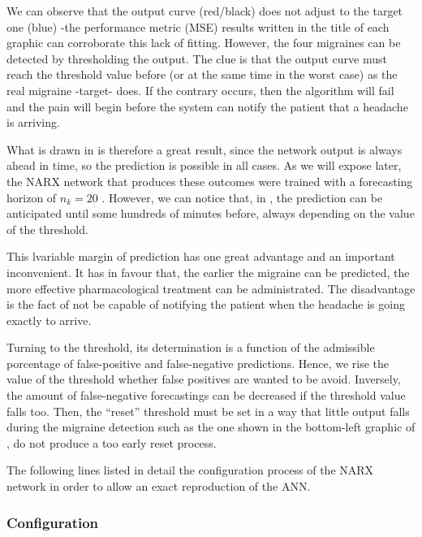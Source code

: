 We can observe that the output curve (red/black) does not adjust to the target one (blue) -the performance metric (MSE) results written in the title of each graphic can corroborate this lack of fitting. However, the four migraines can be detected by thresholding the output. The clue is that the output curve must reach the threshold value before (or at the same time in the worst case) as the real migraine -target- does. If the contrary occurs, then the algorithm will fail and  the pain will begin before the system can notify the patient that a headache is arriving.

What is drawn in  is therefore a great result, since the network output is always ahead in time, so the prediction is possible in all cases. 
As we will expose later, the NARX network that produces these outcomes were trained with a forecasting horizon of $n_{k}=20$ . 
However, we can notice that, in , the prediction can be anticipated until some hundreds of minutes before, always depending on the value of the threshold. 

This lvariable margin of prediction has one great advantage and an important inconvenient. 
It has in favour that, the earlier the migraine can be predicted, the more effective pharmacological treatment can be administrated.
The disadvantage is the fact of not be capable of notifying the patient when the headache is going exactly to arrive.

Turning to the threshold, its determination is a function of the admissible porcentage of false-positive and false-negative predictions. 
Hence, we rise the value of the threshold whether false positives are wanted to be avoid. 
Inversely, the amount of false-negative forecastings can be decreased if the threshold value falls too.
Then, the ``reset'' threshold must be set in a way that little output falls during the migraine detection such as the one shown in the bottom-left graphic of , do not produce a too early reset process.

The following lines listed in detail the configuration process of the NARX network
in order to allow an exact reproduction of the ANN.

\subsubsection{Configuration}

